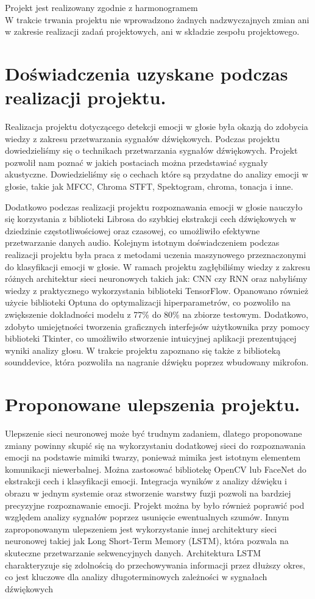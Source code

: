 \documentclass[12pt,titlepage]{article}
\begin{document}
Projekt jest realizowany zgodnie z harmonogramem\\

W trakcie trwania projektu nie wprowadzono żadnych nadzwyczajnych zmian ani w zakresie realizacji zadań projektowych, ani w składzie zespołu projektowego.

\section{Doświadczenia uzyskane podczas realizacji projektu.}
Realizacja projektu dotyczącego detekcji emocji w głosie była okazją do zdobycia wiedzy z zakresu przetwarzania sygnałów dźwiękowych. Podczas projektu dowiedzieliśmy się o technikach przetwarzania sygnałów dźwiękowych. Projekt pozwolił nam poznać w jakich postaciach można przedstawiać sygnały akustyczne. Dowiedzieliśmy się o cechach które są przydatne do analizy emocji w głosie, takie jak MFCC, Chroma STFT, Spektogram, chroma, tonacja i inne.

Dodatkowo podczas realizacji projektu rozpoznawania emocji w głosie nauczyło się korzystania z biblioteki Librosa do szybkiej ekstrakcji cech dźwiękowych w dziedzinie częstotliwościowej oraz czasowej, co umożliwiło efektywne przetwarzanie danych audio. Kolejnym istotnym doświadczeniem podczas realizacji projektu była praca z metodami uczenia maszynowego przeznaczonymi do klasyfikacji emocji w głosie. W ramach projektu zagłębiliśmy wiedzy z zakresu różnych architektur sieci neuronowych takich jak: CNN czy RNN oraz nabyliśmy wiedzy z praktycznego wykorzystania biblioteki TensorFlow.
Opanowano również użycie biblioteki Optuna do optymalizacji hiperparametrów, co pozwoliło na zwiększenie dokładności modelu z 77\% do 80\% na zbiorze testowym. Dodatkowo, zdobyto umiejętności tworzenia graficznych interfejsów użytkownika przy pomocy biblioteki Tkinter, co umożliwiło stworzenie intuicyjnej aplikacji prezentującej wyniki analizy głosu.
W trakcie projektu zapoznano się także z biblioteką sounddevice, która pozwoliła na nagranie dźwięku poprzez wbudowany mikrofon.

\section{Proponowane ulepszenia projektu.}
Ulepszenie sieci neuronowej może być trudnym zadaniem, dlatego proponowane zmiany powinny skupić się na wykorzystaniu dodatkowej sieci do rozpoznawania emocji na podstawie mimiki twarzy, ponieważ mimika jest istotnym elementem komunikacji niewerbalnej. Można zastosować bibliotekę OpenCV lub FaceNet do ekstrakcji cech i klasyfikacji emocji. Integracja wyników z analizy dźwięku i obrazu w jednym systemie oraz stworzenie warstwy fuzji pozwoli na bardziej precyzyjne rozpoznawanie emocji.
Projekt można by było również poprawić pod względem analizy sygnałów poprzez usunięcie ewentualnych szumów.
Innym zaproponowanym ulepszeniem jest wykorzystanie innej architektury sieci neuronowej takiej jak Long Short-Term Memory (LSTM), która pozwala na skuteczne przetwarzanie sekwencyjnych danych. Architektura LSTM charakteryzuje się zdolnością do przechowywania informacji przez dłuższy okres, co jest kluczowe dla analizy długoterminowych zależności w sygnałach dźwiękowych
\end{document}
